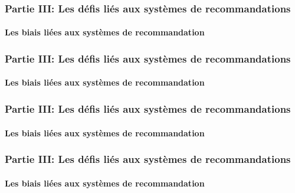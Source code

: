 \begin{frame}

    \frametitle{Partie III: Les défis liés aux systèmes de recommandations}
    \framesubtitle{Les biais liées aux systèmes de recommandation}

    \begin{figure}
        \centering
    \end{figure}

\end{frame}

\begin{frame}

    \frametitle{Partie III: Les défis liés aux systèmes de recommandations}
    \framesubtitle{Les biais liées aux systèmes de recommandation}

    \begin{figure}
        \centering
    \end{figure}

\end{frame}

\begin{frame}

    \frametitle{Partie III: Les défis liés aux systèmes de recommandations}
    \framesubtitle{Les biais liées aux systèmes de recommandation}

    \begin{figure}
        \centering
    \end{figure}

\end{frame}

\begin{frame}

    \frametitle{Partie III: Les défis liés aux systèmes de recommandations}
    \framesubtitle{Les biais liées aux systèmes de recommandation}

    \begin{figure}
        \centering
    \end{figure}

\end{frame}